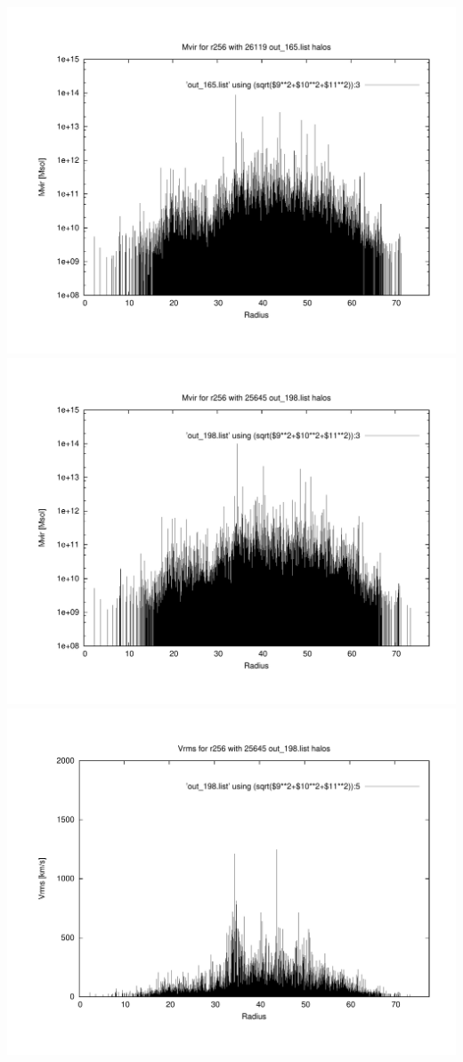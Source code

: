 \includegraphics[scale=0.3]{r256/stages_52/plot_mvir_out_165.pdf}
\includegraphics[scale=0.3]{r256/stages_52/plot_mvir_out_198.pdf}
\includegraphics[scale=0.3]{r256/stages_52/plot_Vrms_out_198.pdf}
